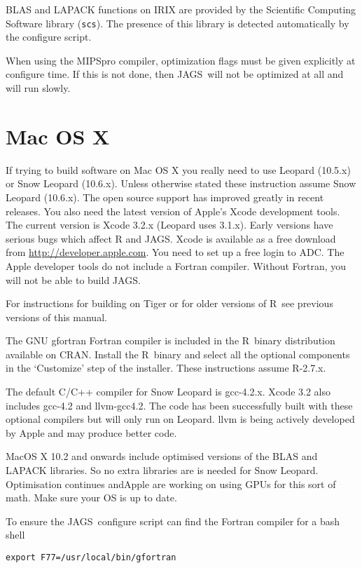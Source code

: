 \documentclass[11pt, a4paper, titlepage]{article}
\newcommand{\JAGS}{\textsf{JAGS}}
\newcommand{\R}{\textsf{R}}
\begin{document}
BLAS and LAPACK functions on IRIX are provided by the Scientific
Computing Software library (\verb+scs+). The presence of this library
is detected automatically by the configure script.

When using the MIPSpro compiler, optimization flags must be given
explicitly at configure time. If this is not done, then \JAGS\ will
not be optimized at all and will run slowly.

\clearpage
\section{Mac OS X}

If trying to build software on Mac OS X you really need to use Leopard
(10.5.x) or Snow Leopard (10.6.x). Unless otherwise stated these
instruction assume Snow Leopard (10.6.x). The open source support has
improved greatly in recent releases. You also need the latest version
of Apple's Xcode development tools. The current version is Xcode 3.2.x
(Leopard uses 3.1.x).  Early versions have serious bugs which affect R
and \JAGS.  Xcode is available as a free download from
\url{http://developer.apple.com}. You need to set up a free login to
ADC. The Apple developer tools do not include a Fortran
compiler. Without Fortran, you will not be able to build \JAGS.

For instructions for building on Tiger or for older versions of
\R\ see previous versions of this manual.

The GNU gfortran Fortran compiler is included in the \R\ binary
distribution available on CRAN. Install the \R\ binary and select all
the optional components in the `Customize' step of the installer.
These instructions assume R-2.7.x.

The default C/C++ compiler for Snow Leopard is gcc-4.2.x. Xcode 3.2
also includes gcc-4.2 and llvm-gcc4.2.  The code has been successfully
built with these optional compilers but will only run on Leopard.
llvm is being actively developed by Apple and may produce better code.

MacOS X 10.2 and onwards include optimised versions of the BLAS and
LAPACK libraries.  So no extra libraries are is needed for Snow
Leopard.  Optimisation continues andApple are working on using GPUs
for this sort of math.  Make sure your OS is up to date.

To ensure the \JAGS\ configure script can find the Fortran compiler
for a bash shell
\begin{verbatim}
export F77=/usr/local/bin/gfortran
\end{verbatim}
\end{document}
